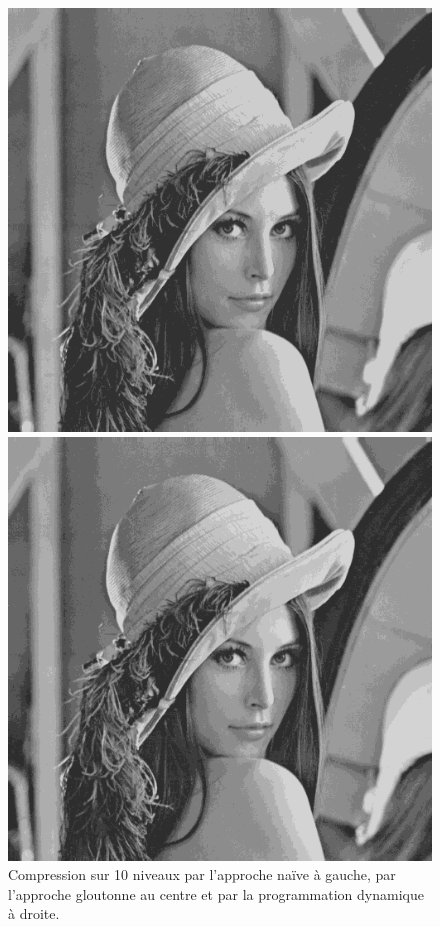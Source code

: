 \documentclass[a4paper, 12pt]{article}
\begin{document}
\begin{figure}[ht!]
\begin{minipage}[b]{0.3\linewidth}
    	    \includegraphics[scale=0.3]{resources/png/greedy10.png}
        \end{minipage}\hfill
        \begin{minipage}[b]{0.3\linewidth}
    	    \includegraphics[scale=0.3]{resources/png/dp10.png}
        \end{minipage}
        \caption{Compression sur 10 niveaux par l'approche naïve à gauche, par l'approche gloutonne au centre et par la programmation dynamique à droite.}
    \end{figure}
    
\end{document}
